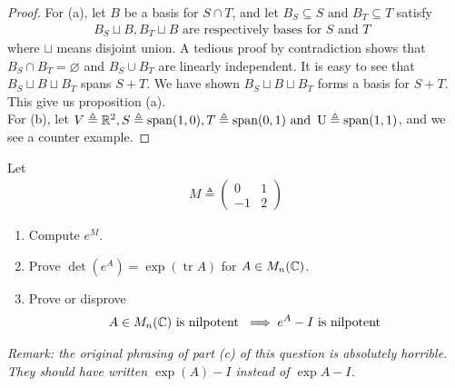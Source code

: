 \documentclass{report}
\begin{document}
\begin{proof}
For (a), let $B$ be a basis for  $S \cap T$, and let $B_S\subseteq S\text{ and }B_T \subseteq T$ satisfy 
\begin{align*}
B_S \sqcup  B,B_T\sqcup  B \text{ are respectively bases for $S$ and  $T$ }
\end{align*}
where $\sqcup $ means disjoint union. A tedious proof by contradiction shows that $B_S \cap B_T=\varnothing$ and $B_S \cup B_T$ are linearly independent. It is easy to see that $B_S\sqcup B\sqcup B_T$ spans $S+T$. We have shown $B_S \sqcup B \sqcup B_T$ forms a basis for $S+T$. This give us proposition (a). \\

For (b), let $V\triangleq \mathbb{R}^2,S\triangleq \operatorname{span}(1,0),T\triangleq \operatorname{span}(0,1)\text{ and }\operatorname{U}\triangleq \operatorname{span}(1,1)$, and we see a counter example.  
\end{proof}
\begin{question}{}{}
Let 
\begin{align*}
M\triangleq \begin{pmatrix} 
  0 & 1 \\
  -1 & 2
\end{pmatrix}
\end{align*}
\begin{enumerate}[label=(\alph*)]
  \item Compute $e^M$. 
  \item Prove $\operatorname{det}(e^A)= \exp (\operatorname{tr}A)$ for $A\in M_n(\mathbb{C})$. 
  \item Prove or disprove 
    \begin{align*}
    A\in M_n(\mathbb{C})\text{ is nilpotent }\implies e^{A}-I\text{ is nilpotent }
    \end{align*}
\end{enumerate}
\emph{Remark: the original phrasing of part (c) of this question is absolutely horrible. They should have written $\exp (A)-I$ instead of $\exp A-I$.}
\end{question}
\end{document}
